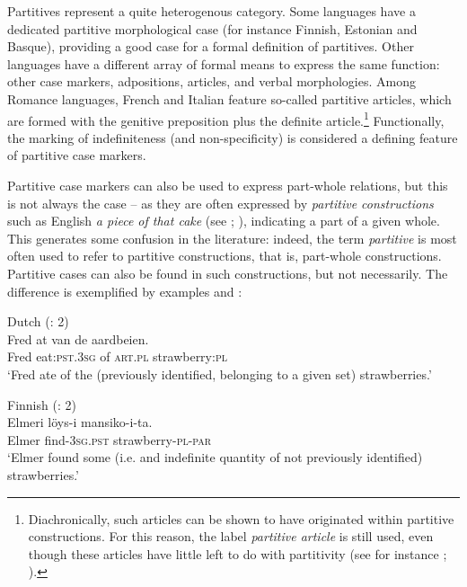 \hspace*{-1pt}Partitives represent a quite heterogenous category. Some languages have a ded\-icated partitive morphological case (for instance Finnish, Estonian and Basque), providing a good case for a formal definition of partitives. Other languages have a different array of formal means to express the same function: other case markers, adpositions, articles, and verbal morphologies. Among Romance languages, French and Italian feature so-called partitive articles, which are formed with the genitive preposition plus the definite article.\footnote{Diachronically, such articles can be shown to have originated within partitive constructions. For this reason, the label \textit{partitive article} is still used, even though these articles have little left to do with partitivity (see for instance \citealt{Stark2007}; \citealt{CarlierLamiroy2014}).} Functionally, the marking of indefiniteness (and non-specificity) is considered a defining feature of partitive case markers.

Partitive case markers can also be used to express part-whole relations, but this is not always the case – as they are often expressed by \textit{partitive constructions} such as English \textit{a piece of that cake} (see \citealt{Koptjevskaja-Tamm2006}; \citealt{Keizer2007}), indicating a part of a given whole. This generates some confusion in the literature: indeed, the term \textit{partitive} is most often used to refer to partitive constructions, that is, part-whole constructions. Partitive cases can also be found in such constructions, but not necessarily. The difference is exemplified by examples  and :

\ea%
    \label{ex:key:51}
           Dutch (\citealt{LuraghiHuumo2014}: 2)\\
\gll Fred   at     van   de     aardbeien.\\
Fred   eat:\textsc{pst.3sg}   of   \textsc{art.pl}   strawberry:\textsc{pl}\\

\glt ‘Fred ate of the (previously identified, belonging to a given set) strawberries.’
    \z %

\ea%
    \label{ex:key:52}
          Finnish (\citealt{LuraghiHuumo2014}: 2)\\
\gll Elmeri   löys-i     mansiko-i-ta.\\
Elmer   find-\textsc{3sg.pst}   strawberry\textsc{{}-pl-par}\\
\glt ‘Elmer found some (i.e. and indefinite quantity of not previously identified) strawberries.’
    \z

